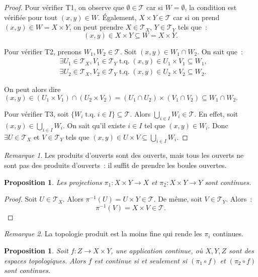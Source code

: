 \documentclass{report}
\newtheorem{prp}[thm]{Proposition}
\theoremstyle{definition}
\theoremstyle{remark}
\newtheorem*{rmq}{Remarque}
\DeclareMathOperator{\tq}{\text{ t.q. }}
\renewcommand{\top}{\mathcal T}
\begin{document}
		\begin{proof} Pour vérifier T1, on observe que $\emptyset \in \top$ car si $W = \emptyset$, la condition est vérifiée pour tout $(x, y) \in W$.
		Également, $X \times Y \in \top$ car si on prend $(x, y) \in W = X \times Y$, on peut prendre $X \in \top_X$, $Y \in \top_Y$ tels que~:
		\[(x, y) \in X \times Y \subseteq W = X \times Y.\]

		Pour vérifier T2, prenons $W_1, W_2 \in \top$. Soit $(x, y) \in W_1 \cap W_2$. On sait que~:
		\begin{align*}
			&\exists U_1 \in \top_X, V_1 \in \top_Y \tq (x, y) \in U_1 \times V_1 \subseteq W_1, \\
			&\exists U_2 \in \top_X, V_2 \in \top_Y \tq (x, y) \in U_2 \times V_2 \subseteq W_2.
		\end{align*}

		On peut alors dire $(x, y) \in (U_1 \times V_1) \cap (U_2 \times V_2) = (U_1 \cap U_2) \times (V_1 \cap V_2) \subseteq W_1 \cap W_2.$

		Pour vérifier T3, soit $\{W_i \tq i \in I\} \subseteq \top$. Alors $\bigcup_{i \in I}W_i \in \top$. En effet, soit $(x, y) \in \bigcup_{i \in I}W_i$.
		On sait qu'il existe $i \in I$ tel que $(x, y) \in W_i$. Donc $\exists U \in \top_X$ et $V \in \top_Y$ tels que
		$(x, y) \in U \times V \subseteq \bigcup_{i \in I}W_i$.
		\end{proof}

		\begin{rmq} Les produits d'ouverts sont des ouverts, mais tous les ouverts ne sont pas des produits d'ouverts~: il suffit de prendre les boules ouvertes.
		\end{rmq}

		\begin{prp}\label{prp:projcont} Les projections $\pi_1 : X \times Y \to X$ et $\pi_2 : X \times Y \to Y$ sont continues.
		\end{prp}

		\begin{proof} Soit $U \in \top_X$. Alors $\pi^{-1}(U) = U \times Y \in \top$. De même, soit $V \in \top_Y$. Alors~:
		\[\pi^{-1}(V) = X \times V \in \top.\]
		\end{proof}

		\begin{rmq} La topologie produit est la moins fine qui rende les $\pi_i$ continues.
		\end{rmq}

		\begin{prp} Soit $f : Z \to X \times Y$, une application continue, où $X, Y, Z$ sont des espaces topologiques. Alors $f$ est continue si et seulement si
		$(\pi_1 \circ f)$ et $(\pi_2 \circ f)$ sont continues.
		\end{prp}
\end{document}
